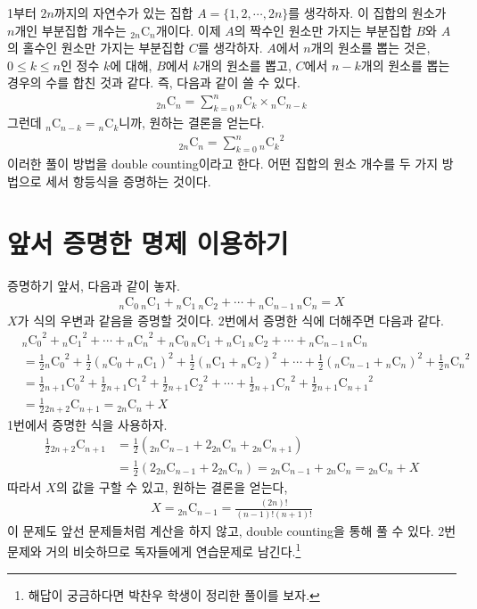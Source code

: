 \documentclass{scrartcl}
\newcommand{\combi}[2]{{}_{#1}\mathrm{C}_{#2}}
\begin{document}
1부터 \(2n\)까지의 자연수가 있는 집합 \(A=\{1,2,\cdots,2n\}\)를 생각하자. 이 집합의 원소가 \(n\)개인 부분집합 개수는 \(\combi{2n}{n}\)개이다. 이제 \(A\)의 짝수인 원소만 가지는 부분집합 \(B\)와 \(A\)의 홀수인 원소만 가지는 부분집합 \(C\)를 생각하자. \(A\)에서 \(n\)개의 원소를 뽑는 것은, \(0\leq k\leq n\)인 정수 \(k\)에 대해, \(B\)에서 \(k\)개의 원소를 뽑고, \(C\)에서 \(n-k\)개의 원소를 뽑는 경우의 수를 합친 것과 같다. 즉, 다음과 같이 쓸 수 있다.
\begin{align*}
  \combi{2n}{n}=\sum_{k=0}^n\combi{n}{k}\times\combi{n}{n-k}
\end{align*}
그런데 \(\combi{n}{n-k}=\combi{n}{k}\)니까, 원하는 결론을 얻는다.
\begin{align*}
  \combi{2n}{n}=\sum_{k=0}^n{\combi{n}{k}}^2
\end{align*}
이러한 풀이 방법을 double counting이라고 한다. 어떤 집합의 원소 개수를 두 가지 방법으로 세서 항등식을 증명하는 것이다.

\section{앞서 증명한 명제 이용하기}
증명하기 앞서, 다음과 같이 놓자.
\begin{align*}
  \combi{n}{0}\,\combi{n}{1}+\combi{n}{1}\,\combi{n}{2}+\cdots+\combi{n}{n-1}\,\combi{n}{n}=X
\end{align*}
\(X\)가 식의 우변과 같음을 증명할 것이다. 2번에서 증명한 식에 더해주면 다음과 같다.
\begin{align*}
  &{\combi{n}{0}}^2+{\combi{n}{1}}^2+\cdots+{\combi{n}{n}}^2+\combi{n}{0}\,\combi{n}{1}+\combi{n}{1}\,\combi{n}{2}+\cdots+\combi{n}{n-1}\,\combi{n}{n} \\
  &=\frac{1}{2}{\combi{n}{0}}^2+\frac{1}{2}(\combi{n}{0}+\combi{n}{1})^2+\frac{1}{2}(\combi{n}{1}+\combi{n}{2})^2+\cdots+\frac{1}{2}(\combi{n}{n-1}+\combi{n}{n})^2+\frac{1}{2}{\combi{n}{n}}^2 \\
  &=\frac{1}{2}{\combi{n+1}{0}}^2+\frac{1}{2}{\combi{n+1}{1}}^2+\frac{1}{2}{\combi{n+1}{2}}^2+\cdots+\frac{1}{2}{\combi{n+1}{n}}^2+\frac{1}{2}{\combi{n+1}{n+1}}^2 \\
  &=\frac{1}{2}\combi{2n+2}{n+1}=\combi{2n}{n}+X
\end{align*}
1번에서 증명한 식을 사용하자.
\begin{align*}
  \frac{1}{2}\combi{2n+2}{n+1}&=\frac{1}{2}(\combi{2n}{n-1}+2\combi{2n}{n}+\combi{2n}{n+1}) \\
  &=\frac{1}{2}(2\combi{2n}{n-1}+2\combi{2n}{n})=\combi{2n}{n-1}+\combi{2n}{n}=\combi{2n}{n}+X
\end{align*}
따라서 \(X\)의 값을 구할 수 있고, 원하는 결론을 얻는다,
\begin{align*}
  X=\combi{2n}{n-1}=\frac{(2n)!}{(n-1)!(n+1)!}
\end{align*}
이 문제도 앞선 문제들처럼 계산을 하지 않고, double counting을 통해 풀 수 있다. 2번 문제와 거의 비슷하므로 독자들에게 연습문제로 남긴다.\footnote{해답이 궁금하다면 박찬우 학생이 정리한 풀이를 보자.}
\end{document}
